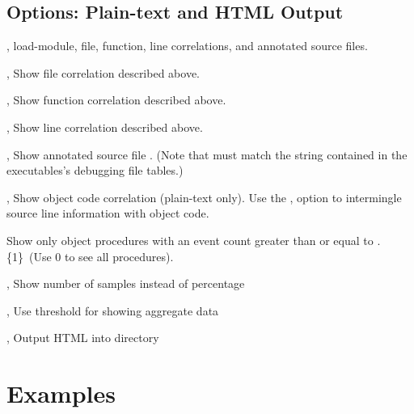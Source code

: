 \documentclass[english]{article}
\begin{document}
\subsection{Options: Plain-text and HTML Output}
\begin{Description}
  \item[\Opt{-e}, \Opt{--everything}] load-module, file, function, line correlations, and annotated source files.
  \item[\Opt{-f}, \Opt{--files}] Show file correlation described above.
  \item[\Opt{-r}, \Opt{--funcs}] Show function correlation described above.
  \item[\Opt{-l}, \Opt{--lines}] Show line correlation described above.
  \item[\OptArg{-a}{file}, \OptArg{--annotate}{file}] Show annotated source file .  (Note that  must match the string contained in the executables's debugging file tables.)

  \item[\Opt{-o}, \Opt{--object}] Show object code correlation (plain-text only).  Use the ,  option to intermingle source line information with object code.
  \item[\Opt{--othreshold}] Show only object procedures with an event count greater than or equal to .  \{1\}\  (Use 0 to see all procedures).

  \item[\Opt{-n}, \Opt{--number}] Show number of samples instead of percentage
  \item[\OptArg{-s}{n}, \OptArg{--show}{n}] Use threshold  for showing aggregate data
  \item[\OptArg{-H}{dir}, \OptArg{--html}{dir}] Output HTML into directory 
\end{Description}



\section{Examples}
\end{document}
